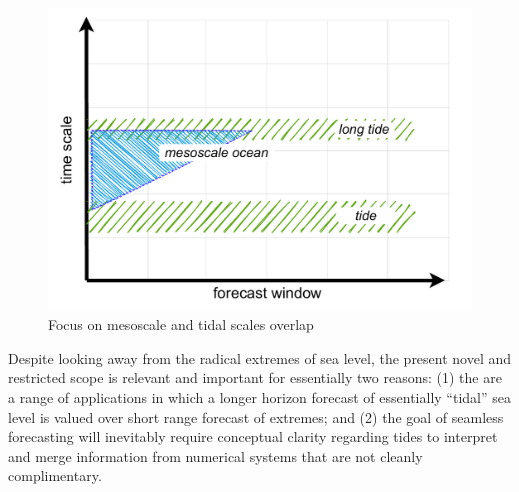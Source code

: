 \begin{figure}[H]\centering
  \includegraphics[width=\figwidthBig]{figures/diagrams/scales_focus.pdf}
  \caption{Focus on mesoscale and tidal scales overlap}
  \label{fig:forecastScalesFocus}
\end{figure}

Despite looking away from the radical extremes of sea level, the present novel and restricted scope is relevant and important for essentially two  reasons: (1) the are a range of applications in which a longer horizon forecast of essentially ``tidal'' sea level is valued over short range forecast of extremes; and (2) the goal of seamless forecasting will inevitably require conceptual clarity regarding tides to interpret and merge information from numerical systems that are not cleanly complimentary. 

